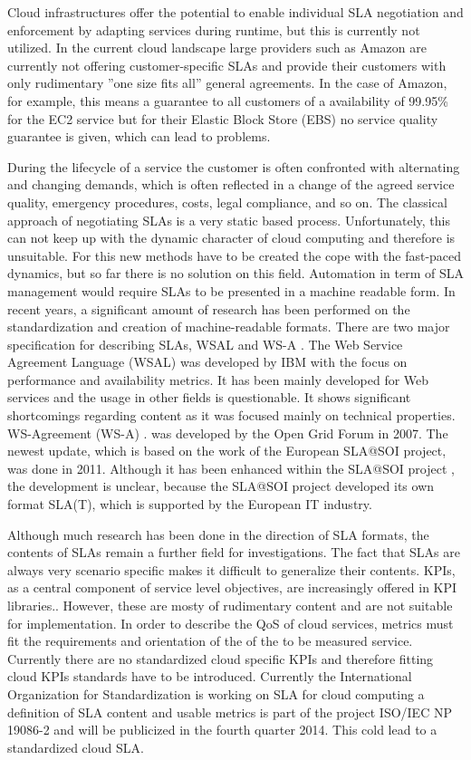 Cloud infrastructures offer the potential to enable individual SLA negotiation and enforcement by adapting services during runtime, but this is currently not utilized. In the current cloud landscape large providers such as Amazon are currently not offering customer-specific SLAs and provide their customers with only rudimentary ”one size fits all” general agreements. In the case of Amazon, for example, this means a guarantee to all customers of a availability of 99.95\% for the EC2 service but for their Elastic Block Store (EBS) no service quality guarantee is given, which can lead to problems. 

During the lifecycle of a service the customer is often confronted with alternating and changing demands, which is often reflected in a change of the agreed service quality, emergency procedures, costs, legal compliance, and so on. The classical approach of negotiating SLAs is a very static based process. Unfortunately, this can not keep up with the dynamic character of cloud computing and therefore is unsuitable. For this new methods have to be created the cope with the fast-paced dynamics, but so far there is no solution on this field. Automation in term  of SLA management would require SLAs to be presented in a machine readable form. In recent years, a significant amount of research has been performed on the standardization and creation of machine-readable formats. There are two major specification for describing SLAs, WSAL \cite{Ludwig03WSLA} and WS-A \cite{Kearney2011b}.  The Web Service Agreement Language (WSAL) \cite{Ludwig03WSLA} was developed by IBM with the focus on performance and availability metrics. It has been mainly developed for Web services and the usage in other fields is questionable. It shows significant shortcomings regarding content as it was focused mainly on technical properties. WS-Agreement (WS-A) \cite{Kearney2011b}.  was developed by the Open Grid Forum in 2007. The newest update, which is based on the work of the European SLA@SOI project, was done in 2011. Although it has been enhanced within the SLA@SOI project \cite{slasoi2011}, the development is unclear, because the SLA@SOI project developed its own format SLA(T), which is supported by the European IT industry.

Although much research has been done in the direction of SLA formats, the contents of SLAs remain a further field for investigations. The fact that SLAs are always very scenario specific makes it difficult to generalize their contents. KPIs, as a central component of service level objectives, are increasingly offered in KPI libraries.\cite{KPI}. However, these are mosty of rudimentary content and are not suitable for implementation. In order to describe the QoS of cloud services, metrics must fit the requirements and orientation of the of the to be measured service. Currently there are no standardized cloud specific KPIs and therefore fitting cloud KPIs standards have to be introduced. Currently the International Organization for Standardization is working on SLA for cloud computing a definition of SLA content and usable metrics is part of the project ISO/IEC NP 19086-2 \cite{ISOnew} and will be publicized in the fourth quarter 2014. This cold lead to a standardized cloud SLA.

